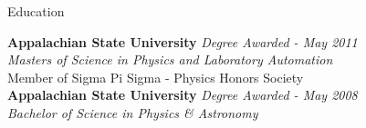 \documentclass{cv} %
\begin{document}

\begin{rSection}{Education}

{\bf Appalachian State University} \hfill {\em Degree Awarded - May 2011} \\ 
{\em Masters of Science in Physics and Laboratory Automation} \\
Member of Sigma Pi Sigma - Physics Honors Society \\

{\bf Appalachian State University} \hfill {\em Degree Awarded - May 2008} \\ 
{\em Bachelor of Science in Physics \& Astronomy} \\

\end{rSection}

\end{document}
